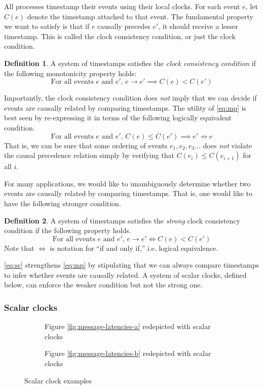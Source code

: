 \documentclass[]             %
{NASA}                       %
\theoremstyle{definition}
\newtheorem{definition}{Definition}[section]
\begin{document}
All processes timestamp their events using their local clocks. For
each event $e$, let $C(e)$ denote the timestamp attached to that
event. The fundamental property we want to satisfy is that if $e$
causally precedes $e'$, it should receive a lesser timestamp. This is
called the clock consistency condition, or just the clock condition.
\begin{definition}
  A system of timestamps satisfies the \emph{clock consistency
  condition} if the following monotonicity property holds:
  \[ \textrm{For all events $e$ and $e'$, } e \to e' \implies C(e) < C(e') \label{eq:mp}\tag{CC} \]
\end{definition}

Importantly, the clock consistency condition does \emph{not} imply
that we can decide if events are causally related by comparing
timestamps. The utility of \eqref{eq:mp} is best seen by re-expressing
it in terms of the following logically equivalent condition.
\[ \textrm{For all events $e$ and $e'$, }C(e) \leq C(e') \implies e'
  \not\to e \label{eq:mp-conv} \] That is, we can be sure that some
ordering of events $e_1, e_2, e_3\ldots$ does \emph{not} violate the
causal precedence relation simply by verifying that
$C(e_{i}) \leq C(e_{i+1})$ for all $i$.

For many applications, we would like to unambiguously determine
whether two events are causally related by comparing timestamps. That
is, one would like to have the following stronger condition.
\begin{definition}
  A system of timestamps satisfies the \emph{strong} clock consistency
  condition if the following property holds.
  \[ \textrm{For all events $e$ and $e'$, } e \to e' \iff C(e) < C(e') \label{eq:sc}\tag{SC} \]
  Note that $\iff$ is notation for ``if and only if,'' i.e. logical equivalence.
\end{definition}
\ref{eq:sc} strengthens \ref{eq:mp} by stipulating that we can always
compare timestamps to infer whether events are causally related. A
system of scalar clocks, defined below, can enforce the weaker
condition but not the strong one.

\subsubsection{Scalar clocks}
\label{sssec:scalar-clocks}
\begin{figure}
  \setlength\belowcaptionskip{5ex}

  \begin{subfigure}{1\textwidth}
    \centering 
    \caption{Figure \ref{fig:message-latencies-a} redepicted with scalar clocks}
    \label{fig:message-latencies-scalar-a}
  \end{subfigure}

  \begin{subfigure}{1\textwidth}
    \centering 
    \caption{Figure \ref{fig:message-latencies-b} redepicted with scalar clocks}
    \label{fig:message-latencies-scalar-b}
  \end{subfigure}

  \caption{Scalar clock examples}
  \label{fig:message-latencies-scalar}
\end{figure}
\end{document}
